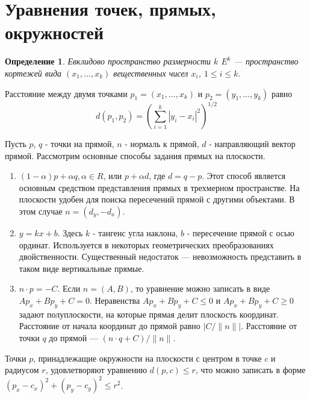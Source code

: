 \documentclass[a4paper]{article}
\renewcommand{\le}{\leqslant}
\renewcommand{\ge}{\geqslant}
\newtheorem{define}{Определение}
\begin{document}
\section{Уравнения точек, прямых, окружностей}
\begin{define}
  Евклидово пространство размерности $k$ $E^k$ --- пространство
  кортежей вида $(x_1, \ldots, x_k)$ вещественных чисел $x_i$, $1 \le
  i \le k$.
\end{define}

Расстояние между двумя точками $p_1 = (x_1, \ldots, x_k)$ и $p_2 =
(y_1, \ldots, y_k)$ равно $$d(p_1, p_2) = \left(\sum_{i=1}^k|y_i -
x_i|^2\right)^{1/2}$$

Пусть $p$, $q$ - точки на прямой, $n$ - нормаль к прямой, $d$ -
направляющий вектор прямой.
Рассмотрим основные способы задания прямых на плоскости.
\begin{enumerate}
\item $(1 - \alpha) p + \alpha q, \alpha \in R$, или $p + \alpha d$,
  где $d = q - p$. Этот способ является
  основным средством представления прямых в трехмерном пространстве.
  На плоскости удобен для поиска пересечений прямой с другими
  объектами. В этом случае $n = (d_y, -d_x)$.
\item $y = kx + b$. Здесь $k$ - тангенс угла наклона, $b$ -
  пересечение прямой с осью ординат. Используется в некоторых
  геометрических преобразованиях двойственности. Существенный
  недостаток --- невозможность представить в таком виде вертикальные
  прямые.
\item $n \cdot p = -C$. Если $n=(A, B)$, то уравнение можно записать в
  виде $Ap_x + Bp_y + C=0$. Неравенства $Ap_x + Bp_y + C \le 0$ и
  $Ap_x + Bp_y + C \ge 0$ задают полуплоскости, на которые прямая
  делит плоскость координат. Расстояние от начала координат до прямой
  равно $|C / \|n\||$. Расстояние от точки $q$ до прямой --- $(n \cdot
  q + C) / \|n\|$.
\end{enumerate}

Точки $p$, принадлежащие окружности на плоскости с центром в точке
$c$ и радиусом $r$, удовлетворяют уравнению $d(p, c) \le r$, что можно
записать в форме $(p_x - c_x)^2 + (p_y - c_y)^2 \le r^2$.
\end{document}
